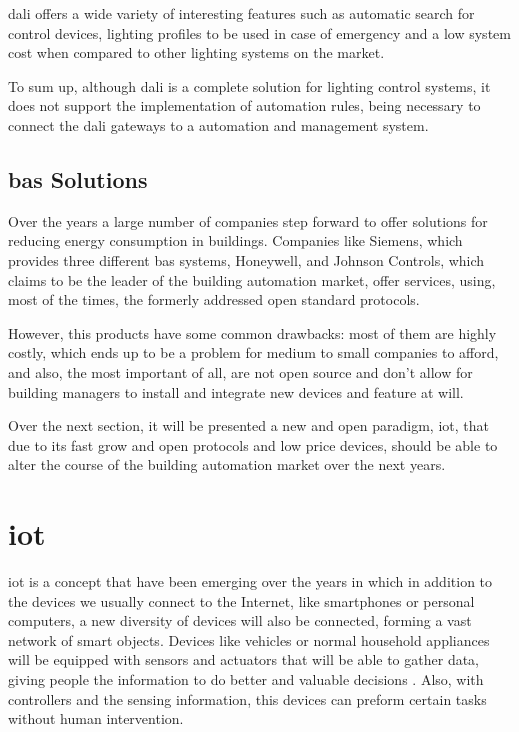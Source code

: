 \ac{dali} offers a wide variety of interesting features such as automatic search for control devices, lighting profiles to be used in case of emergency and a low system cost when compared to other lighting systems on the market\cite{Zhang2006}.

To sum up, although \ac{dali} is a complete solution for lighting control systems, it does not support the implementation of automation rules, being necessary to connect the \ac{dali} gateways to a automation and management system.

\subsection{\ac{bas} Solutions}

Over the years a large number of companies step forward to offer solutions for reducing energy consumption in buildings. Companies like Siemens, which provides three different \ac{bas} systems, Honeywell, and Johnson Controls, which claims to be the leader of the building automation market, offer services, using, most of the times, the formerly addressed open standard protocols.

However, this products have some common drawbacks: most of them are highly costly, which ends up to be a problem for medium to small companies to afford, and also, the most important of all, are not open source and don't allow for building managers to install and integrate new devices and feature at will. 

Over the next section, it will be presented a new and open paradigm, \acf{iot}, that due to its fast grow and open protocols and low price devices, should be able to alter the course of the building automation market over the next years.

\section{\acf{iot}}

\acf{iot} is a concept that have been emerging over the years in which in addition to the devices we usually connect to the Internet, like smartphones or personal computers, a new diversity of devices will also be connected, forming a vast network of smart objects. Devices like vehicles or normal household appliances will be equipped with sensors and actuators that will be able to gather data, giving people the information to do better and valuable decisions \cite{Weiser1991}. Also, with controllers and the sensing information, this devices can preform certain tasks without human intervention.

